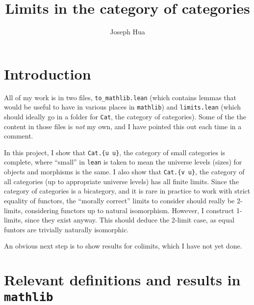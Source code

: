 \documentclass{article}
\newcommand{\<}{\langle}
\renewcommand{\>}{\rangle}
\theoremstyle{definitionstyle}
\theoremstyle{exercisestyle}
\theoremstyle{remarkstyle}
\begin{document}
\title{Limits in the category of categories}
\author{Joseph Hua}
\maketitle

\section{Introduction}

All of my work is in two files, \texttt{to\_mathlib.lean}
(which contains lemmas that would be useful to have in various places in \texttt{mathlib})
and \texttt{limits.lean}
(which should ideally go in a folder for \texttt{Cat}, the category of categories).
Some of the the content in those files is \textit{not} my own,
and I have pointed this out each time in a comment.

In this project, I show that \texttt{Cat.\{u u\}}, the category of small categories
is complete, where ``small'' in \texttt{lean} is taken to mean
the universe levels (sizes) for objects and morphisms is the same.
I also show that \texttt{Cat.\{v u\}}, the category of all categories
(up to appropriate universe levels) has all finite limits.
Since the category of categories is a bicategory,
and it is rare in practice to work with strict equality of functors,
the ``morally correct'' limits to consider should really be 2-limits,
considering functors up to natural isomorphism.
However, I construct 1-limits, since they exist anyway.
This should deduce the 2-limit case, as equal funtors are trivially naturally isomorphic.

An obvious next step is to show results for colimits, which I have not yet done.

\section{Relevant definitions and results in \texttt{mathlib}}
\end{document}
